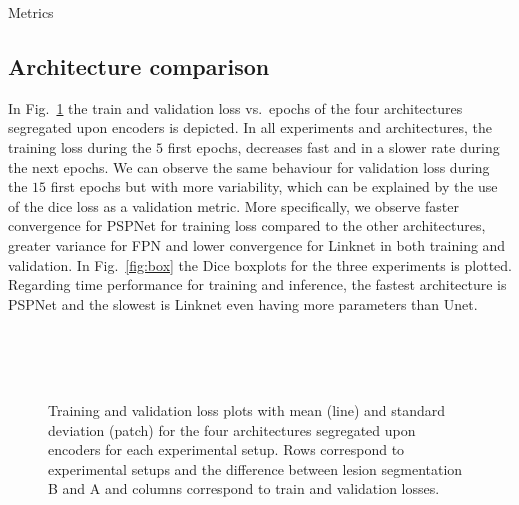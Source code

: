 \documentclass[journal]{IEEEtran}
\begin{document}
\begin{table*}[!t]
	\centering
	\caption{Metrics}
	\label{table:metrics}
	\setlength\tabcolsep{6.5pt}
	\scalebox{0.64}{}
\end{table*}

\subsection{Architecture comparison}
In Fig.~\ref{fig:loss} the train and validation loss vs.\ epochs of the four architectures segregated upon encoders is depicted.
In all experiments and architectures, the training loss during the $5$ first epochs, decreases fast and in a slower rate during the next epochs.
We can observe the same behaviour for validation loss during the $15$ first epochs but with more variability, which can be explained by the use of the dice loss as a validation metric.
More specifically, we observe faster convergence for PSPNet for training loss compared to the other architectures, greater variance for FPN and lower convergence for Linknet in both training and validation.
In Fig.~\ref{fig:box} the Dice boxplots for the three experiments is plotted.
Regarding time performance for training and inference, the fastest architecture is PSPNet and the slowest is Linknet even having more parameters than Unet.

\begin{figure}[!t]
	\\
	\\
	\\
	\setcounter{subfigure}{0}
	\caption{Training and validation loss plots with mean (line) and standard deviation (patch) for the four architectures segregated upon encoders for each experimental setup.
	Rows correspond to experimental setups and the difference between lesion segmentation B and A and columns correspond to train and validation losses.}
	\label{fig:loss}
\end{figure}
\end{document}
